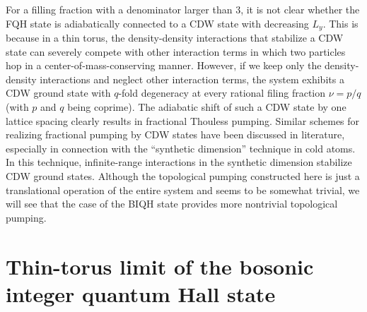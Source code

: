 \documentclass[aps,prb,twocolumn,superscriptaddress,showpacs,floatfix]{revtex4-1}
\begin{document}
For a filling fraction with a denominator larger than $3$, it is not clear whether the FQH state is adiabatically connected to a CDW state with decreasing $L_y$. 
This is because in a thin torus, the density-density interactions that stabilize a CDW state can severely compete with other interaction terms in which two particles hop in a center-of-mass-conserving manner.\cite{Seidel,Bergholtz1,Bergholtz2,Nakamura, Wang} 
However, if we keep only the density-density interactions and neglect other interaction terms, the system exhibits a CDW ground state with $q$-fold degeneracy at every rational filing fraction $\nu=p/q$ (with $p$ and $q$ being coprime).\cite{Bergholtz1,Bergholtz2, Seidel, Rotondo} The adiabatic shift of such a CDW state by one lattice spacing clearly results in fractional Thouless pumping. 
Similar schemes for realizing fractional pumping by CDW states have been discussed in literature,\cite{Meidan, Grusdt, Zeng, Zeng2, Taddia} especially in connection with the ``synthetic dimension'' technique\cite{Celi} in cold atoms. 
In this technique, infinite-range interactions in the synthetic dimension stabilize CDW ground states.\cite{Grusdt, Zeng, Taddia, Barbarino, SaitoFurukawa} Although the topological pumping constructed here is just a translational operation of the entire system and seems to be somewhat trivial, we will see that the case of the BIQH state provides more nontrivial topological pumping.


\section{Thin-torus limit of the bosonic integer quantum Hall state\label{ttl}}
\end{document}
